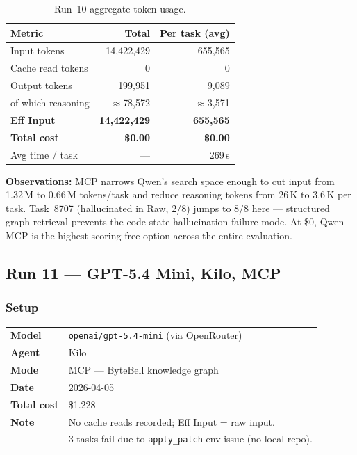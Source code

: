 \begin{table}[h]
\centering
\caption{Run~10 aggregate token usage.}\label{tab:r10-tokens}
\begin{tabular}{lrr}
\toprule
\textbf{Metric} & \textbf{Total} & \textbf{Per task (avg)} \\
\midrule
Input tokens         & 14,422,429 & 655,565 \\
Cache read tokens    & 0          & 0 \\
Output tokens        & 199,951    & 9,089  \\
\quad of which reasoning & $\approx$78,572 & $\approx$3,571 \\
\midrule
\textbf{Eff Input}   & \textbf{14,422,429} & \textbf{655,565} \\
\textbf{Total cost}  & \textbf{\$0.00}     & \textbf{\$0.00} \\
Avg time / task      & ---         & 269\,s \\
\bottomrule
\end{tabular}
\end{table}

\noindent
\textbf{Observations:} MCP narrows Qwen's search space enough to cut
input from 1.32\,M to 0.66\,M tokens/task and reduce reasoning tokens
from 26\,K to 3.6\,K per task.
Task~8707 (hallucinated in Raw, 2/8) jumps to 8/8 here --- structured
graph retrieval prevents the code-state hallucination failure mode.
At \$0, Qwen MCP is the highest-scoring free option across the entire evaluation.

\subsection{Run 11 --- GPT-5.4 Mini, Kilo, MCP}
\label{sec:run11}

\subsubsection{Setup}

\begin{tabular}{ll}
\textbf{Model}     & \texttt{openai/gpt-5.4-mini} (via OpenRouter) \\
\textbf{Agent}     & Kilo \\
\textbf{Mode}      & MCP --- ByteBell knowledge graph \\
\textbf{Date}      & 2026-04-05 \\
\textbf{Total cost} & \$1.228 \\
\textbf{Note}      & No cache reads recorded; Eff Input = raw input. \\
                   & 3 tasks fail due to \texttt{apply\_patch} env issue (no local repo). \\
\end{tabular}

